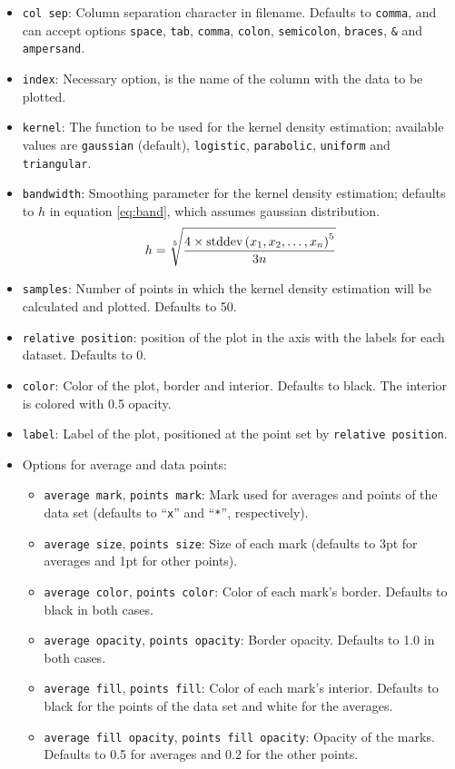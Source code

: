 \documentclass{article}
\begin{document}
\begin{itemize}
	\item \texttt{col sep}: Column separation character in filename.
		Defaults to \texttt{comma}, and can accept options
		\texttt{space}, \texttt{tab}, \texttt{comma},
		\texttt{colon}, \texttt{semicolon}, \texttt{braces},
		\texttt{\&} and \texttt{ampersand}.
	\item \texttt{index}: Necessary option, is the name of the column with
		the data to be plotted.
	\item \texttt{kernel}: The function to be used for the kernel density
		estimation; available values are \texttt{gaussian} (default),
		\texttt{logistic}, \texttt{parabolic}, \texttt{uniform}
		and \texttt{triangular}.
	\item \texttt{bandwidth}: Smoothing parameter for the kernel density
		estimation; defaults to $h$ in equation \ref{eq:band},
		which assumes gaussian distribution.
		\begin{equation}
			\label{eq:band}
			h=\sqrt[5]{\frac{4\times\textnormal{stddev}%
			\left(x_1,x_2,\ldots,x_n\right)^5}{3n}}
		\end{equation}
	\item \texttt{samples}: Number of points in which the kernel density
		estimation will be calculated and plotted. Defaults
		to 50.
	\item \texttt{relative position}: position of the plot in the axis
		with the labels for each dataset. Defaults to 0.
	\item \texttt{color}: Color of the plot, border and interior.
		Defaults to black. The interior is colored with 0.5
		opacity.
	\item \texttt{label}: Label of the plot, positioned at the point
		set by \texttt{relative position}.
	\item Options for average and data points:
	\begin{itemize}
		\item \texttt{average mark}, \texttt{points mark}: Mark used
			for averages and points of the data set (defaults
			to ``\texttt{x}'' and ``\texttt{*}'', respectively).
		\item \texttt{average size}, \texttt{points size}: Size
			of each mark (defaults to 3pt for averages and 1pt
			for other points).
		\item \texttt{average color}, \texttt{points color}: Color
			of each mark's border. Defaults to black in both
			cases.
		\item \texttt{average opacity}, \texttt{points opacity}:
			Border opacity. Defaults to 1.0 in both cases.
		\item \texttt{average fill}, \texttt{points fill}: Color
			of each mark's interior. Defaults to black for the
			points of the data set and white for the averages.
		\item \texttt{average fill opacity}, \texttt{points fill opacity}:
			Opacity of the marks. Defaults to 0.5 for averages and
			0.2 for the other points.
	\end{itemize}
\end{itemize}
\end{document}
